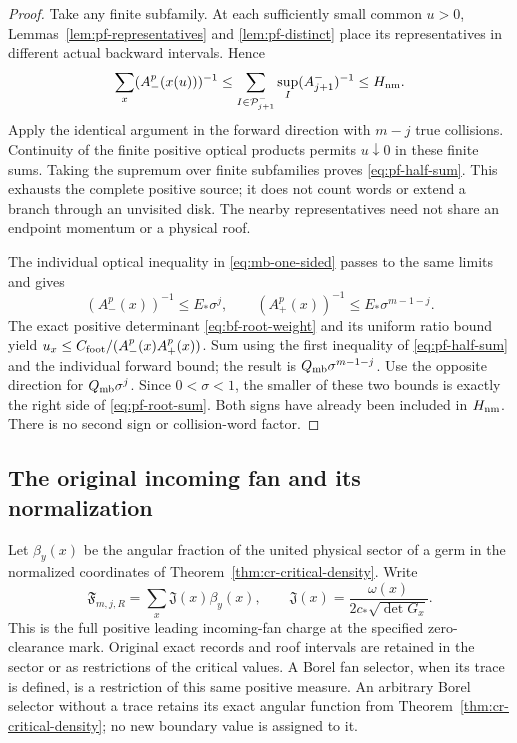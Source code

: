 \begin{proof}
Take any finite subfamily.  At each sufficiently small common
$u>0$, Lemmas~\ref{lem:pf-representatives} and
\ref{lem:pf-distinct} place its representatives in different
actual backward intervals.  Hence
\[
 \sum_x (A_-^p(x(u)))^{-1}
 \le\sum_{I\in\mathcal P^-_{j+1}}
                         \sup_I(A^-_{j+1})^{-1}
 \le H_{\rm nm}.
\]
Apply the identical argument in the forward direction with $m-j$
true collisions.  Continuity of the finite positive optical
products permits $u\downarrow0$ in these finite sums.  Taking
the supremum over finite subfamilies proves
\eqref{eq:pf-half-sum}.  This exhausts the complete positive
source; it does not count words or extend a branch through an
unvisited disk.  The nearby representatives need not share an
endpoint momentum or a physical roof.

The individual optical inequality in \eqref{eq:mb-one-sided}
passes to the same limits and gives
\[
 (A_-^p(x))^{-1}\le E_*\sigma^j,
 \qquad (A_+^p(x))^{-1}\le E_*\sigma^{m-1-j}.
\]
The exact positive determinant \eqref{eq:bf-root-weight} and its
uniform ratio bound yield
$u_x\le C_{\rm foot}/(A_-^p(x)A_+^p(x))$.
Sum using the first inequality of \eqref{eq:pf-half-sum} and
the individual forward bound; the result is
$Q_{\rm mb}\sigma^{m-1-j}$.  Use the opposite direction for
$Q_{\rm mb}\sigma^j$.  Since $0<\sigma<1$, the smaller of
these two bounds is exactly the right side of
\eqref{eq:pf-root-sum}.  Both signs have already been included
in $H_{\rm nm}$.  There is no second sign or collision-word factor.
\end{proof}

\subsection{The original incoming fan and its normalization}

Let $\beta_y(x)$ be the angular fraction of the united physical
sector of a germ in the normalized coordinates of
Theorem~\ref{thm:cr-critical-density}.  Write
\[
 \mathfrak F_{m,j,R}
       =\sum_x\mathfrak J(x)\beta_y(x),\qquad
 \mathfrak J(x)=\frac{\omega(x)}{2c_*\sqrt{\det G_x}}.
\]
This is the full positive leading incoming-fan charge at the
specified zero-clearance mark.  Original exact records and roof
intervals are retained in the sector or as restrictions of the
critical values.  A Borel fan selector, when its trace is defined,
is a restriction of this same positive measure.  An arbitrary
Borel selector without a trace retains its exact angular function
from Theorem~\ref{thm:cr-critical-density}; no new boundary value
is assigned to it.

